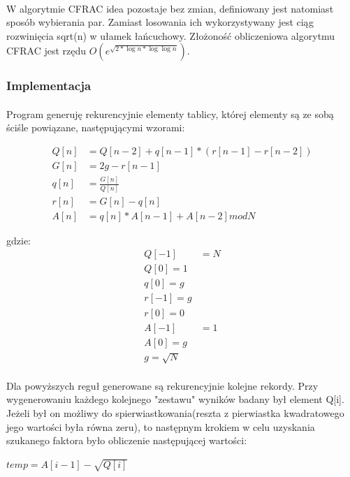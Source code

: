 \documentclass{article}
\begin{document}
\paragraph{}W algorytmie CFRAC idea pozostaje bez zmian, definiowany jest natomiast sposób wybierania par. Zamiast losowania ich wykorzystywany jest ciąg rozwinięcia sqrt(n) w ułamek łańcuchowy. Złożoność obliczeniowa algorytmu CFRAC jest rzędu $O(e^{\sqrt{2*\log{n}* \log{\log{n}}}})$.

\subsubsection{Implementacja\cite{cfracimpl}}
\paragraph{}Program generuję rekurencyjnie elementy tablicy, której elementy są ze sobą ściśle powiązane, następującymi wzorami:

\begin{align*}
Q[n] &= Q[n-2] + q[n-1] * (r[n-1] - r[n-2])\\
G[n] &= 2g - r[n-1]\\
q[n] &= \frac{G[n]}{Q[n]}\\
r[n] &= G[n] - q[n]\\
A[n] &= q[n]*A[n-1] + A[n-2]modN
\end{align*}

gdzie:\begin{align*}
Q[-1]&= N\\Q[0] = 1\\ q[0] = g\\r[-1] = g\\r[0] = 0\\
A[-1]&= 1\\A[0] = g\\g = \sqrt{N}
\end{align*}	
\paragraph{}Dla powyższych reguł generowane są rekurencyjnie kolejne rekordy. Przy wygenerowaniu każdego kolejnego "zestawu" wyników badany był element Q[i]. Jeżeli był on możliwy do spierwiastkowania(reszta z pierwiastka kwadratowego jego wartości była równa zeru), to następnym krokiem w celu uzyskania szukanego faktora było obliczenie następującej wartości:

$temp = A[i-1] - \sqrt{Q[i]}$
\end{document}
